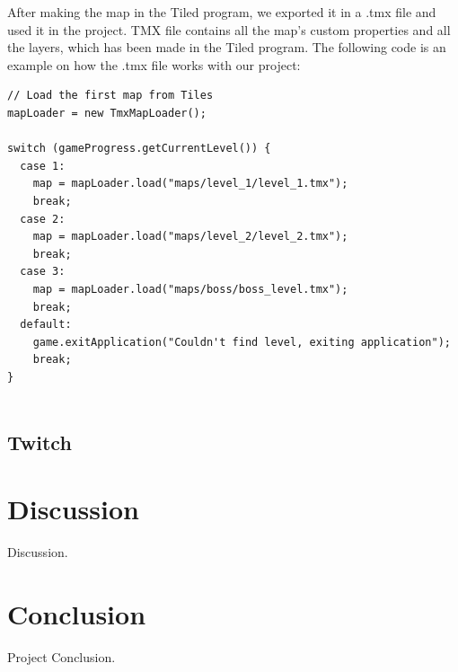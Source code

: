 \documentclass[12p]{article}
\begin{document}
After making the map in the Tiled program, we exported it in a .tmx file and used it in the project. TMX file contains all the map’s custom properties and all the layers, which has been made in the Tiled program. The following code is an example on how the .tmx file works with our project:

\begin{verbatim}
// Load the first map from Tiles
mapLoader = new TmxMapLoader();

switch (gameProgress.getCurrentLevel()) {
  case 1:
    map = mapLoader.load("maps/level_1/level_1.tmx");
    break;
  case 2:
    map = mapLoader.load("maps/level_2/level_2.tmx");
    break;
  case 3:
    map = mapLoader.load("maps/boss/boss_level.tmx");
    break;
  default:
    game.exitApplication("Couldn't find level, exiting application");
    break;
}


\end{verbatim}



\subsection{Twitch} \label{Twitch}


\newpage
\section{Discussion}

Discussion.


\newpage
\section{Conclusion}

Project Conclusion.

\end{document}
